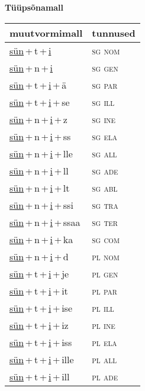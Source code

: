 
\vspace{1.8em}
\begin{minipage}{\textwidth}
\textbf{Tüüpsõnamall \,}\\

\begin{sideways}
\begin{tabular}{l l}
muutvormimall & tunnused \\
\hline
\underline{sün}\,+\,t\,+\,\underline{i} & \textsc{ sg nom } \\
\underline{sün}\,+\,n\,+\,\underline{i} & \textsc{ sg gen } \\
\underline{sün}\,+\,t\,+\,\underline{i}\,+\,ä & \textsc{ sg par } \\
\underline{sün}\,+\,t\,+\,\underline{i}\,+\,se & \textsc{ sg ill } \\
\underline{sün}\,+\,n\,+\,\underline{i}\,+\,z & \textsc{ sg ine } \\
\underline{sün}\,+\,n\,+\,\underline{i}\,+\,ss & \textsc{ sg ela } \\
\underline{sün}\,+\,n\,+\,\underline{i}\,+\,lle & \textsc{ sg all } \\
\underline{sün}\,+\,n\,+\,\underline{i}\,+\,ll & \textsc{ sg ade } \\
\underline{sün}\,+\,n\,+\,\underline{i}\,+\,lt & \textsc{ sg abl } \\
\underline{sün}\,+\,n\,+\,\underline{i}\,+\,ssi & \textsc{ sg tra } \\
\underline{sün}\,+\,n\,+\,\underline{i}\,+\,ssaa & \textsc{ sg ter } \\
\underline{sün}\,+\,n\,+\,\underline{i}\,+\,ka & \textsc{ sg com } \\
\underline{sün}\,+\,n\,+\,\underline{i}\,+\,d & \textsc{ pl nom } \\
\underline{sün}\,+\,t\,+\,\underline{i}\,+\,je & \textsc{ pl gen } \\
\underline{sün}\,+\,t\,+\,\underline{i}\,+\,it & \textsc{ pl par } \\
\underline{sün}\,+\,t\,+\,\underline{i}\,+\,ise & \textsc{ pl ill } \\
\underline{sün}\,+\,t\,+\,\underline{i}\,+\,iz & \textsc{ pl ine } \\
\underline{sün}\,+\,t\,+\,\underline{i}\,+\,iss & \textsc{ pl ela } \\
\underline{sün}\,+\,t\,+\,\underline{i}\,+\,ille & \textsc{ pl all } \\
\underline{sün}\,+\,t\,+\,\underline{i}\,+\,ill & \textsc{ pl ade } \\

\end{tabular}
\end{sideways}
\end{minipage}
